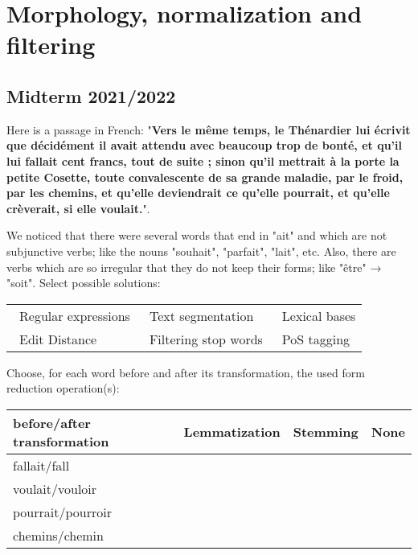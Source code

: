 \documentclass[11pt, a4paper]{article}
\begin{document}
\section{Morphology, normalization and filtering}

\subsection{Midterm 2021/2022}

Here is a passage in French: "\textbf{Vers le même temps, le Thénardier lui écrivit que décidément il avait attendu avec beaucoup trop de bonté, et qu'il lui fallait cent francs, tout de suite ; sinon qu'il mettrait à la porte la petite Cosette, toute convalescente de sa grande maladie, par le froid, par les chemins, et qu'elle deviendrait ce qu'elle pourrait, et qu'elle crèverait, si elle voulait.}".

We noticed that there were several words that end in "ait" and which are not subjunctive verbs; like the nouns "souhait", "parfait", "lait", etc.
Also, there are verbs which are so irregular that they do not keep their forms; like "être" → "soit". 
Select possible solutions:
\begin{center}
	\begin{tabular}{|lll|}
		\hline
		\Square\ Regular expressions & 
		\Square\ Text segmentation & 
		\Square\ Lexical bases \\
		\Square\ Edit Distance &
		\Square\ Filtering stop words &
		\Square\ PoS tagging\\
		\hline
	\end{tabular}
\end{center}

Choose, for each word before and after its transformation, the used form reduction operation(s):
\begin{center}
	\begin{tabular}{|l|c|c|c|}
		\hline
		before/after transformation & 
		Lemmatization & 
		Stemming &
		None\\
		\hline
		fallait/fall & \Square & \Square\ & \Square \\ \hline
		voulait/vouloir & \Square & \Square\ & \Square \\ \hline
		pourrait/pourroir & \Square & \Square\ & \Square \\ \hline
		chemins/chemin & \Square & \Square\ & \Square \\ \hline

		\hline
	\end{tabular}
\end{center}
\end{document}
